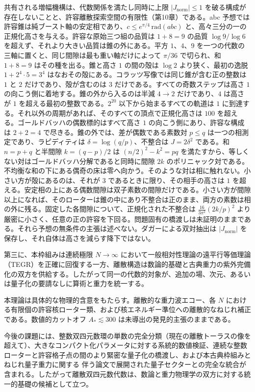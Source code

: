 \documentclass[a4paper]{article}
\theoremstyle{definition}
\theoremstyle{remark}
\newcommand{\Jnorm}{J_{\mathrm{norm}}}
\begin{document}
共有される増幅機構は、代数関係を満たし同時に上限 \( |\Jnorm| \leq 1 \) を破る構成が存在しないことと、許容離散探索空間の有限性（第10章）である。abc 予想では許容錐は純ブースト軸の安定相であり、\(c\le e^{\pi/4}\,\mathrm{rad}(abc)\) と、高々三分の一の正規化高さを与える。許容な原始三つ組の品質は \(1+8=9\) の品質 \(\log 9/\log 6\) を超えず、それより大きい品質は錐の外にある。平方 \(1\)、\(4\)、\(9\) を一つの代数の三軸に置くと、同じ間隙は最も重い軸だけによって \(\pi/36\) で切られ、和 \(1+8=9\) はその種を出る。錐と高さ \(1\) の間の殻は \(\log 2\) より狭く、最初の逸脱 \(1+2^4\cdot 5=3^4\) はなおその殻にある。コラッツ写像では同じ錐が含む正の整数は \(1\) と \(2\) だけであり、殻が含むのは \(3\) だけである。すべての奇数ステップは高さ \(1\) の向こう側に着地する。錐の外から入るのは半減 \(4\to 2\) だけであり、\(4\) は高さが \(1\) を超える最初の整数である。\(2^{20}\) 以下から始まるすべての軌道は \(1\) に到達する。それ以外の周期があれば、そのすべての頂点で正規化高さは \(100\) を超える。ゴールドバッハの偶数標的はすべて高さ \(1\) の向こう側にあり、許容な構成は \(2+2=4\) で尽きる。錐の外では、差が偶数である素数対 \(p\le q\) は一つの相測定であり、ラピディティは \(\delta=\log(q/p)\)、不整合は \(J=2\delta^2\) である。和 \(n=p+q\) と半間隙 \(k=(q-p)/2\) は \((n/2)^2-k^2=pq\) を満たすから、等しくない対はゴールドバッハ分解であると同時に間隙 \(2k\) のポリニャック対である。不均衡な和の下にある偶奇の床は零へ向かう。そのような対は相に触れない。小さい方が殻にあるのは、それが \(3\) であるときに限り、その相手の高さは \(1\) を超える。安定相の上にある偶数間隙は双子素数の間隙だけである。小さい方が間隙以上になれば、そのローターは錐の中にあり不整合は正のまま、両方の素数は相の外に残る。固定した各間隙について、正規化された不整合は \(\frac{16}{3\pi^2}(2k/p)^2\) より厳密に小さく、任意の正の許容を下回る。問題固有の橋渡しは未証明のままである。それら予想の無条件の主張は述べない。ダガーによる双対抽出は \(|\Jnorm|\) を保存し、それ自体は高さを減らす降下ではない。

第三に、本枠組みは連続極限 \( N \to \infty \) において一般相対性理論の遠平行等価理論（TEGR）を正確に回復する一方、離散構造は数論的基礎と古典重力の紫外完備化の双方を供給する。したがって同一の代数的対象が、追加の場、次元、あるいは量子化の要請なしに算術と重力を統一する。

本理論は具体的な物理的含意をもたらす。離散的な重力波エコー、各 \(N\) における有限個の許容核ローター類、および核エネルギー準位への離散的なねじれ補正である。数値的カットオフ \(A_* \lesssim 300\) は未導出の発見的主張のままである。

今後の課題には、整数双四元数環の単数の完全分類（現在の離散トーラスの像を超えて）、大きなコンパクト化パラメータに対する系統的数値検証、連続な整数ローターと許容格子点の間のより緊密な量子化の橋渡し、および本古典枠組みとねじれ量子重力に関する 伴う論文で展開された量子セクターとの完全な統合が含まれる。したがって離散双四元数代数は、数論と重力物理学の双方に対する統一的基礎の候補として立つ。
\end{document}
